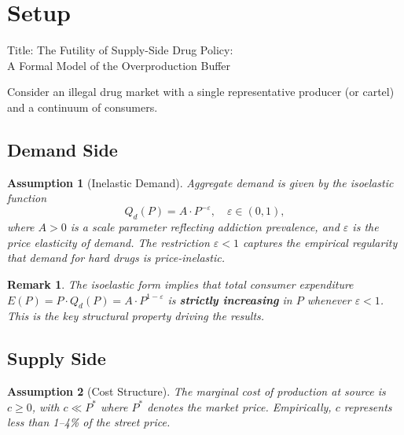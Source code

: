 \documentclass[12pt, a4paper]{article}
\newtheorem{assumption}{Assumption}
\newtheorem{remark}{Remark}
\begin{document}
\newpage








\section{Setup}
Title: The Futility of Supply-Side Drug Policy:\\ A Formal Model of the Overproduction Buffer

Consider an illegal drug market with a single representative producer (or cartel) and a continuum of consumers.

\subsection{Demand Side}

\begin{assumption}[Inelastic Demand]
\label{ass:demand}
Aggregate demand is given by the isoelastic function
\begin{equation}
Q_d(P) = A \cdot P^{-\varepsilon}, \quad \varepsilon \in (0,1),
\end{equation}
where $A > 0$ is a scale parameter reflecting addiction prevalence, and $\varepsilon$ is the price elasticity of demand. The restriction $\varepsilon < 1$ captures the empirical regularity that demand for hard drugs is price-inelastic.
\end{assumption}

\begin{remark}
The isoelastic form implies that total consumer expenditure $E(P) = P \cdot Q_d(P) = A \cdot P^{1-\varepsilon}$ is \textbf{strictly increasing} in $P$ whenever $\varepsilon < 1$. This is the key structural property driving the results.
\end{remark}

\subsection{Supply Side}

\begin{assumption}[Cost Structure]
\label{ass:cost}
The marginal cost of production at source is $c \geq 0$, with $c \ll P^*$ where $P^*$ denotes the market price. Empirically, $c$ represents less than 1--4\% of the street price.
\end{assumption}
\end{document}
